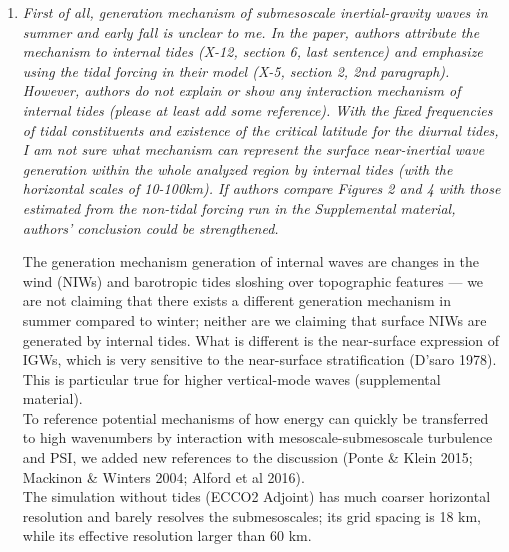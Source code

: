 \documentclass[11pt]{article}
\newcommand{\bdp}{\begin{description}}
\newcommand{\edp}{\end{description}}
\begin{document}
\begin{enumerate}

  \item {\it First of all, generation mechanism of submesoscale inertial-gravity waves in summer
        and early fall is unclear to me. In the paper, authors attribute the mechanism to
        internal tides (X-12, section 6, last sentence) and emphasize using the tidal forcing in
        their model (X-5, section 2, 2nd paragraph). However, authors do not explain or show
        any interaction mechanism of internal tides (please at least add some reference). With
        the fixed frequencies of tidal constituents and existence of the critical latitude for the
        diurnal tides, I am not sure what mechanism can represent the surface near-inertial
        wave generation within the whole analyzed region by internal tides (with the
        horizontal scales of 10-100km). If authors compare Figures 2 and 4 with those
        estimated from the non-tidal forcing run in the Supplemental material, authors'
        conclusion could be strengthened.}\\

        \bdp
          The generation mechanism generation of internal
          waves are changes in the wind (NIWs) and barotropic tides sloshing over
          topographic features --- we are not claiming that there exists a different
          generation mechanism
          in summer compared to winter; neither are we claiming that surface NIWs
          are generated by internal tides. What is different is the near-surface
          expression of IGWs, which is very sensitive to the near-surface stratification
          (D'saro 1978). This is particular true for higher vertical-mode waves
          (supplemental material).\\

          To reference potential mechanisms of how energy can quickly be transferred to
          high wavenumbers by interaction with mesoscale-submesoscale turbulence and
           PSI,  we added new references to the discussion (Ponte \& Klein 2015;
          Mackinon \& Winters 2004; Alford et al 2016). \\

          The simulation without tides (ECCO2 Adjoint) has much coarser
          horizontal resolution and barely resolves the submesoscales; its grid
          spacing is 18 km, while its effective resolution larger than 60 km.
      \edp



\end{enumerate}
\end{document}
